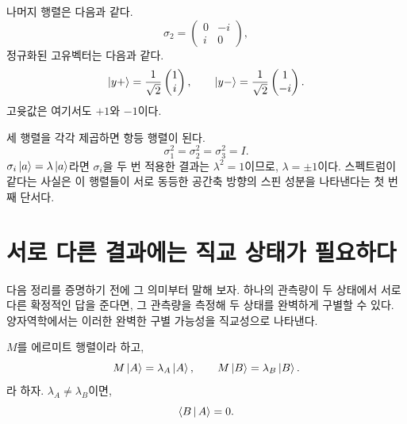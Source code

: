 \begin{classroomqa}\end{classroomqa}

나머지 행렬은 다음과 같다. \begin{equation}
  \sigma_2=
  \begin{pmatrix}
    0&-i\\
    i&0
  \end{pmatrix},
\end{equation}정규화된 고유벡터는 다음과 같다. \begin{equation}
  \left\lvert y+\right\rangle=\frac{1}{\sqrt2}\begin{pmatrix}1\\i\end{pmatrix},
  \qquad
  \left\lvert y-\right\rangle=\frac{1}{\sqrt2}\begin{pmatrix}1\\-i\end{pmatrix}.
  \label{eq:l03-sigma-two-eigenvectors}
\end{equation}고윳값은 여기서도 \(+1\)와 \(-1\)이다.

세 행렬을 각각 제곱하면 항등 행렬이 된다. \begin{equation}
  \sigma_1^2=\sigma_2^2=\sigma_3^2=I.
  \label{eq:l03-pauli-squares}
\end{equation}\(\sigma_i\left\lvert a\right\rangle=\lambda\left\lvert a\right\rangle\)라면 \(\sigma_i\)을 두 번 적용한 결과는 \(\lambda^2=1\)이므로, \(\lambda=\pm1\)이다. 스펙트럼이 같다는 사실은 이 행렬들이 서로 동등한 공간축 방향의 스핀 성분을 나타낸다는 첫 번째 단서다.

\section{서로 다른 결과에는 직교 상태가 필요하다}

다음 정리를 증명하기 전에 그 의미부터 말해 보자. 하나의 관측량이 두 상태에서 서로 다른 확정적인 답을 준다면, 그 관측량을 측정해 두 상태를 완벽하게 구별할 수 있다. 양자역학에서는 이러한 완벽한 구별 가능성을 직교성으로 나타낸다.

\begin{theorem}\(M\)를 에르미트 행렬이라 하고, \begin{equation}
  M\left\lvert A\right\rangle=\lambda_A\left\lvert A\right\rangle,
  \qquad
  M\left\lvert B\right\rangle=\lambda_B\left\lvert B\right\rangle.
\end{equation}라 하자. \(\lambda_A\ne\lambda_B\)이면, \begin{equation}
  \left\langle B\,\middle|\,A\right\rangle=0.
\end{equation}\end{theorem}

